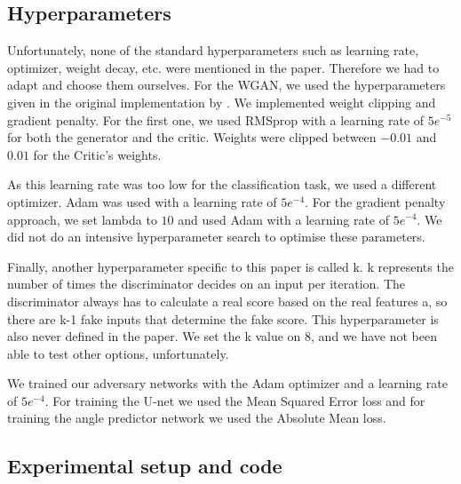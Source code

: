 \subsection{Hyperparameters}

Unfortunately, none of the standard hyperparameters such as learning rate, optimizer, weight decay, etc. were mentioned in the paper. Therefore we had to adapt and choose them ourselves. For the WGAN, we used the hyperparameters given in the original implementation by \cite{pmlr-v70-arjovsky17a}.  We implemented weight clipping and gradient penalty. For the first one, we used RMSprop with a learning rate of $5e^{-5}$ for both the generator and the critic. Weights were clipped between $-0.01$ and $0.01$ for the Critic's weights. 

As this learning rate was too low for the classification task, we used a different optimizer. Adam was used with a learning rate of $5e^{-4}$. For the gradient penalty approach, we set lambda to $10$ and used Adam with a learning rate of $5e^{-4}$. We did not do an intensive hyperparameter search to optimise these parameters.

Finally, another hyperparameter specific to this paper is called k. k represents the number of times the discriminator decides on an input per iteration. The discriminator always has to calculate a real score based on the real features a, so there are k-1 fake inputs that determine the fake score. This hyperparameter is also never defined in the paper. We set the k value on 8, and we have not been able to test other options, unfortunately. 

We trained our adversary networks with the Adam optimizer and a learning rate of $5e^{-4}$. For training the U-net we used the Mean Squared Error loss and for training the angle predictor network we used the Absolute Mean loss.


\subsection{Experimental setup and code}

